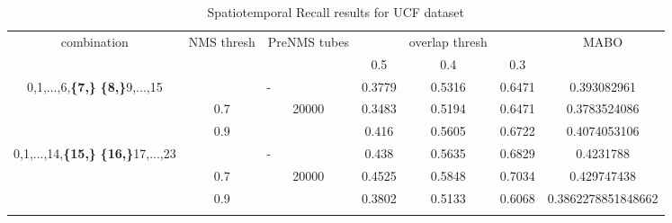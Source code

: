 \begin{center}
  \en
  \setlength{\tabcolsep}{2pt}
\begin{longtable}{||c | c | c | c c c| c|}

  \hline
  \multirow{2}{*}{combination} & \multirow{2}{2.5em}{NMS thresh} & \multirow{2}{3.5em}{PreNMS tubes} &  {} &overlap thresh & {} & \multirow{2}{*}{MABO} \\
  {} & {} & {} &  0.5 &  0.4 & 0.3 & {}\\         
  \hline
  \multirow{3}{7em}{0,1,...,6,\textbf{\{7,\}}
  \textbf{\{8,\}}9,...,15 }   &   \multicolumn{2}{|c|}{-}     &  0.3779 & 0.5316 & 0.6471 & 0.393082961 \\
  \cline{2-7}
  {} & 0.7 &\multirow{2}{*}{20000}  & 0.3483  & 0.5194 & 0.6471 & 0.3783524086 \\
  \cline{2-2} \cline{4-7} 
  {} &  0.9   & {}   & 0.416 & 0.5605 & 0.6722 & 0.4074053106 \\
  \hline                                    
  \multirow{3}{7em}{0,1,...,14,\textbf{\{15,\}}
  \textbf{\{16,\}}17,...,23 }  &   \multicolumn{2}{|c|}{-} & 0.438 & 0.5635 & 0.6829 & 0.4231788 \\
  \cline{2-7}
  {} & 0.7 & \multirow{2}{*}{20000}   & 0.4525 & 0.5848 & 0.7034 & 0.429747438 \\
  \cline{2-2} \cline{4-7} 
  {} &  0.9   & {}   & 0.3802 & 0.5133 & 0.6068 & 0.3862278851848662 \\

  \hline                                    

  \caption{Spatiotemporal Recall results for UCF dataset}
  \label{table:gr_ucf_nms_noup_recall}
\end{longtable} 
\end{center}

